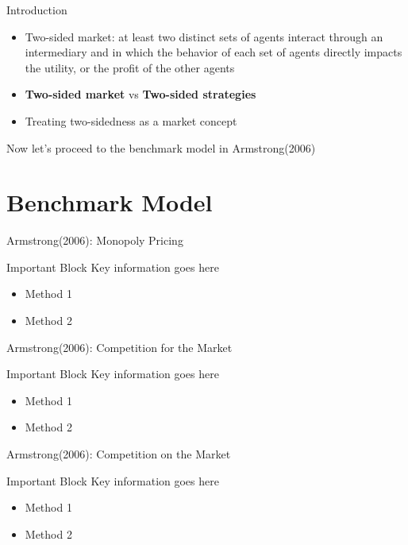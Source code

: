 \documentclass[aspectratio=169]{beamer}  %
\begin{document}
\begin{frame}{Introduction}
    \begin{itemize}        
        \item Two-sided market: at least two distinct sets of agents interact through an intermediary and in which the behavior of each set of agents directly impacts the utility, or the profit of the other agents
        \vspace{1em}
        \item \textbf{Two-sided market} vs \textbf{Two-sided strategies}
        \vspace{1em}
        \item Treating two-sidedness as a market concept
    \end{itemize}
    \vspace{2em}
\quad \quad Now let's proceed to the benchmark model in Armstrong(2006)
\end{frame}

\section{Benchmark Model}
\begin{frame}{Armstrong(2006): Monopoly Pricing}
    \begin{block}{Important Block}
        Key information goes here
    \end{block}
    
    \begin{itemize}
        \item Method 1
        \item Method 2
    \end{itemize}
\end{frame}

\begin{frame}{Armstrong(2006): Competition for the Market}
    \begin{block}{Important Block}
        Key information goes here
    \end{block}
    
    \begin{itemize}
        \item Method 1
        \item Method 2
    \end{itemize}
\end{frame}

\begin{frame}{Armstrong(2006): Competition on the Market}
    \begin{block}{Important Block}
        Key information goes here
    \end{block}
    
    \begin{itemize}
        \item Method 1
        \item Method 2
    \end{itemize}
\end{frame}
\end{document}
